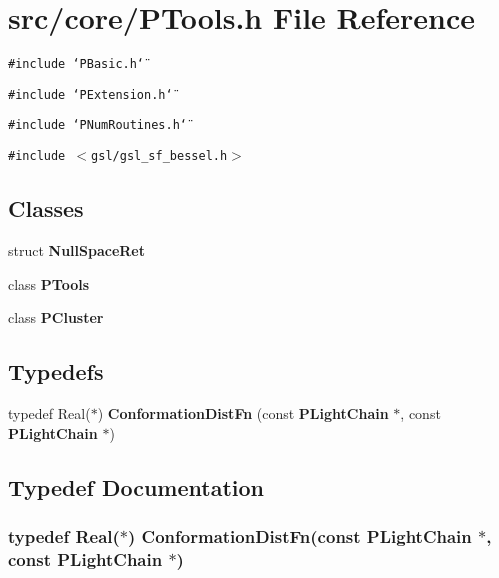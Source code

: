 \section{src/core/PTools.h File Reference}
\label{PTools_8h}


{\tt \#include \char`\"{}PBasic.h\char`\"{}}\par
{\tt \#include \char`\"{}PExtension.h\char`\"{}}\par
{\tt \#include \char`\"{}PNum\-Routines.h\char`\"{}}\par
{\tt \#include $<$gsl/gsl\_\-sf\_\-bessel.h$>$}\par
\subsection*{Classes}
\begin{CompactItemize}
\item 
struct {\bf Null\-Space\-Ret}
\item 
class {\bf PTools}
\item 
class {\bf PCluster}
\end{CompactItemize}
\subsection*{Typedefs}
\begin{CompactItemize}
\item 
typedef Real($\ast$) {\bf Conformation\-Dist\-Fn} (const {\bf PLight\-Chain} $\ast$, const {\bf PLight\-Chain} $\ast$)
\end{CompactItemize}


\subsection{Typedef Documentation}
\subsubsection{\setlength{\rightskip}{0pt plus 5cm}typedef Real($\ast$) {\bf Conformation\-Dist\-Fn}(const {\bf PLight\-Chain} $\ast$, const {\bf PLight\-Chain} $\ast$)}\label{PTools_8h_d5351767d3e9e05e21646e6a6d734fd6}


